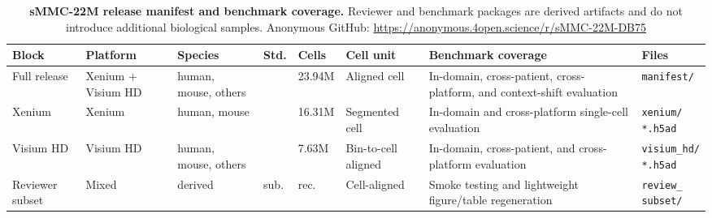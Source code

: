 \documentclass{article}
\begin{document}
\begin{table}[!t]
\centering
\scriptsize
\setlength{\tabcolsep}{2.6pt}
\renewcommand{\arraystretch}{1.05}
\setlength{\abovecaptionskip}{4pt}
\setlength{\belowcaptionskip}{3pt}

\caption{\textbf{sMMC-22M release manifest and benchmark coverage.}
Reviewer and benchmark packages are derived artifacts and do not introduce additional biological samples.
Anonymous GitHub: \protect\url{https://anonymous.4open.science/r/sMMC-22M-DB75}}
\label{tab:main_release_manifest}

\begin{tabularx}{\textwidth}{
>{\raggedright\arraybackslash}p{1.65cm}
>{\raggedright\arraybackslash}p{1.45cm}
>{\raggedright\arraybackslash}p{1.45cm}
>{\centering\arraybackslash}p{0.70cm}
>{\raggedleft\arraybackslash}p{0.90cm}
>{\raggedright\arraybackslash}p{1.45cm}
>{\raggedright\arraybackslash}X
>{\raggedright\arraybackslash}p{1.65cm}
}
\toprule
\textbf{Block} &
\textbf{Platform} &
\textbf{Species} &
\textbf{Std.} &
\textbf{Cells} &
\textbf{Cell unit} &
\textbf{Benchmark coverage} &
\textbf{Files} \\
\midrule

Full release &
Xenium + Visium HD &
human, mouse, others &
66 &
23.94M &
Aligned cell &
In-domain, cross-patient, cross-platform, and context-shift evaluation &
\texttt{manifest/} \\

\addlinespace[1pt]

Xenium &
Xenium &
human, mouse &
42 &
16.31M &
Segmented cell &
In-domain and cross-platform single-cell evaluation &
\makecell[l]{\texttt{xenium/}\\\texttt{*.h5ad}} \\

Visium HD &
Visium HD &
human, mouse, others &
24 &
7.63M &
Bin-to-cell aligned &
In-domain, cross-patient, and cross-platform evaluation &
\makecell[l]{\texttt{visium\_hd/}\\\texttt{*.h5ad}} \\

\midrule

\rowcolor{gray!8}
Reviewer subset &
Mixed &
derived &
sub. &
rec. &
Cell-aligned &
Smoke testing and lightweight figure/table regeneration &
\makecell[l]{\texttt{review\_}\\\texttt{subset/}} \\


\end{tabularx}
\end{table}
\end{document}
